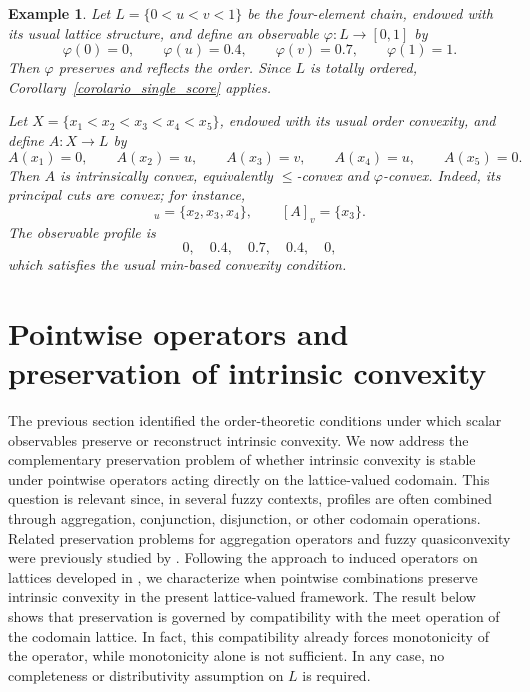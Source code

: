 \documentclass[11pt,a4paper]{article}
\newtheorem{example}{Example}
\begin{document}
\begin{example}\label{ex5}
Let \(L=\{0<u<v<1\}\) be the four-element chain, endowed with its usual lattice structure, and define an observable \(\varphi:L\to[0,1]\) by
\begin{equation*}
\varphi(0)=0,\qquad \varphi(u)=0.4,\qquad \varphi(v)=0.7,\qquad \varphi(1)=1.
\end{equation*}
Then \(\varphi\) preserves and reflects the order. Since \(L\) is totally ordered, Corollary~\ref{corolario_single_score} applies.

Let \(X=\{x_1<x_2<x_3<x_4<x_5\}\), endowed with its usual order convexity, and define \(A:X\to L\) by
\begin{equation*}
A(x_1)=0,\qquad A(x_2)=u,\qquad A(x_3)=v,\qquad A(x_4)=u,\qquad A(x_5)=0.
\end{equation*}
Then \(A\) is intrinsically convex, equivalently \(\leq\)-convex and \(\varphi\)-convex. Indeed, its principal cuts are convex; for instance,
\begin{equation*}
[A]_u=\{x_2,x_3,x_4\},
\qquad
[A]_v=\{x_3\}.
\end{equation*}
The observable profile is
\begin{equation*}
0,\quad 0.4,\quad 0.7,\quad 0.4,\quad 0,
\end{equation*}
which satisfies the usual min-based convexity condition.
\end{example}






\section{Pointwise operators and preservation of intrinsic convexity}\label{sec:pointwise}

The previous section identified the order-theoretic conditions under which scalar observables preserve or reconstruct intrinsic convexity. We now address the complementary preservation problem of whether intrinsic convexity is stable under pointwise operators acting directly on the lattice-valued codomain. This question is relevant since, in several fuzzy contexts, profiles are often combined through aggregation, conjunction, disjunction, or other codomain operations. Related preservation problems for aggregation operators and fuzzy quasiconvexity were previously studied by \citet{JanisKralRencova2013}. Following the approach to induced operators on lattices developed in \citet{LobilloMerinoNavarroSantos2021,MerinoNavarroSantos2022}, we characterize when pointwise combinations preserve intrinsic convexity in the present lattice-valued framework. The result below shows that preservation is governed by compatibility with the meet operation of the codomain lattice. In fact, this compatibility already forces monotonicity of the operator, while monotonicity alone is not sufficient. In any case, no completeness or distributivity assumption on \(L\) is required.
\end{document}
